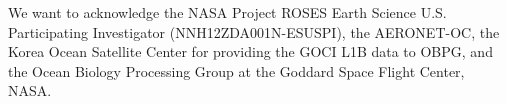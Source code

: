 \documentclass[12pt]{spieman}  %
\begin{document}
\begin{spacing}{2}

\acknowledgments 
We want to acknowledge the NASA Project ROSES Earth Science U.S. Participating Investigator (NNH12ZDA001N-ESUSPI), the AERONET-OC, the Korea Ocean Satellite Center for providing the GOCI L1B data to OBPG, and the Ocean Biology Processing Group at the Goddard Space Flight Center, NASA. 
 






\end{spacing}
\end{document}
